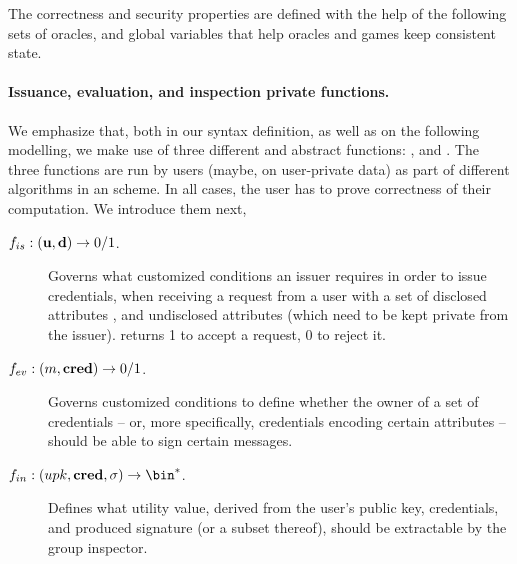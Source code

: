 The correctness and security properties are defined with the help of the
following sets of oracles, and global variables that help oracles and games
keep consistent state.

\paragraph{Issuance, evaluation, and inspection private functions.} %
We emphasize that, both in our syntax definition, as well as on the following
modelling, we make use of three different and abstract functions: \fissue,
\feval and \finsp. The three functions are run by users (maybe, on user-private
data) as part of different algorithms in an \UAS scheme. In all cases, the
user has to prove correctness of their computation. We introduce them next,

\begin{description}
\item[$f_{is}: (\mathbf{u},\mathbf{d}) \rightarrow 0/1$.] Governs what customized
  conditions an issuer requires in order to issue credentials, when receiving
  a request from a user with a set of disclosed attributes \dattrs, and
  undisclosed attributes \uattrs (which need to be kept private from the
  issuer). \fissue returns 1 to accept a request, 0 to reject it.  
\item[$f_{ev}: (m,\mathbf{cred}) \rightarrow 0/1$.] Governs customized conditions
  to define whether the owner of a set of credentials -- or, more specifically,
  credentials encoding certain attributes -- should be able to sign certain
  messages.
\item[$\finsp: (\upk,\scred,\sig) \rightarrow \bin^*$.] Defines what utility
  value, derived from the user's public key, credentials, and produced signature
  (or a subset thereof), should be extractable by the group inspector.
\end{description}

